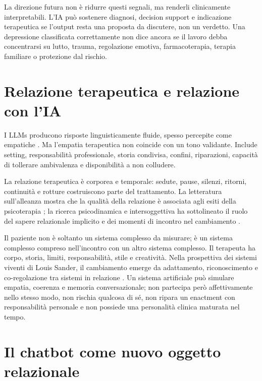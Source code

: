 \documentclass[utf8]{FrontiersinHarvard}
\begin{document}
La direzione futura non \`e ridurre questi segnali, ma renderli clinicamente interpretabili. L'\ac{IA} pu\`o sostenere diagnosi, decision support e indicazione terapeutica se l'output resta una proposta da discutere, non un verdetto. Una depressione classificata correttamente non dice ancora se il lavoro debba concentrarsi su lutto, trauma, regolazione emotiva, farmacoterapia, terapia familiare o protezione dal rischio.

\section{Relazione terapeutica e relazione con l'IA}
\label{sec:relazione}

I \acp{LLM} producono risposte linguisticamente fluide, spesso percepite come empatiche \citep{lee2024empathic,welivita2024empathetic}. Ma l'empatia terapeutica non coincide con un tono validante. Include setting, responsabilit\`a professionale, storia condivisa, confini, riparazioni, capacit\`a di tollerare ambivalenza e disponibilit\`a a non colludere.

La relazione terapeutica \`e corporea e temporale: sedute, pause, silenzi, ritorni, continuit\`a e rotture costruiscono parte del trattamento. La letteratura sull'alleanza mostra che la qualit\`a della relazione \`e associata agli esiti della psicoterapia \citep{bordin1979,fluckiger2018,norcross2011}; la ricerca psicodinamica e intersoggettiva ha sottolineato il ruolo del sapere relazionale implicito e dei momenti di incontro nel cambiamento \citep{stern1998,sander2008,safran2000}.

Il paziente non \`e soltanto un sistema complesso da misurare; \`e un sistema complesso compreso nell'incontro con un altro sistema complesso. Il terapeuta ha corpo, storia, limiti, responsabilit\`a, stile e creativit\`a. Nella prospettiva dei sistemi viventi di Louis Sander, il cambiamento emerge da adattamento, riconoscimento e co-regolazione tra sistemi in relazione \citep{sander1975,sander2008}. Un sistema artificiale pu\`o simulare empatia, coerenza e memoria conversazionale; non partecipa per\`o affettivamente nello stesso modo, non rischia qualcosa di s\'e, non ripara un enactment con responsabilit\`a personale e non possiede una personalit\`a clinica maturata nel tempo.

\section{Il chatbot come nuovo oggetto relazionale}
\label{sec:chatbot}
\end{document}
